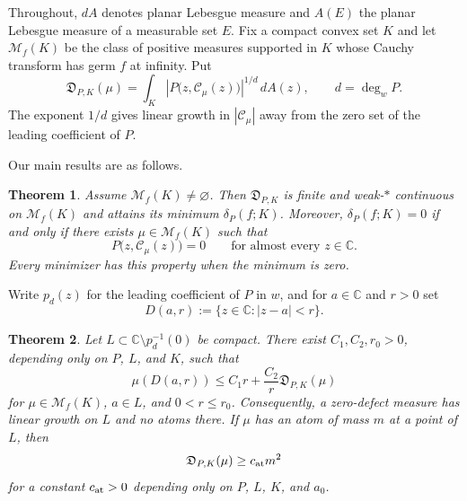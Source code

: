 \documentclass[reqno]{amsart}
\newtheorem{theoremalph}{Theorem}
\theoremstyle{definition}
\theoremstyle{remark}
\newcommand{\bC}{\mathbb C}
\newcommand{\M}{\mathcal M}
\newcommand{\Cauchy}{\mathcal C}
\begin{document}
Throughout, $dA$ denotes planar Lebesgue measure and $A(E)$ the planar
Lebesgue measure of a measurable set $E$. 
Fix a compact convex set $K$ and let $\M_f(K)$ be the class of positive measures
supported in $K$ whose Cauchy transform has germ $f$ at infinity.  Put
\[
 \mathfrak D_{P,K}(\mu)=
 \int_K\left|P\bigl(z,\Cauchy_\mu(z)\bigr)\right|^{1/d}\,dA(z),
 \qquad d=\deg_wP.
\]
The exponent $1/d$ gives linear growth in $|\Cauchy_\mu|$ away from the zero set
of the leading coefficient of $P$.

Our main results are as follows. 

\begin{theoremalph}\label{thmA}
Assume $\M_f(K)\ne\varnothing$.  Then $\mathfrak D_{P,K}$ is finite and
weak-$*$ continuous on $\M_f(K)$ and attains its minimum
$\delta_P(f;K)$.  Moreover, $\delta_P(f;K)=0$ if and only if there exists
$\mu\in\M_f(K)$ such that
\[
 P\bigl(z,\Cauchy_\mu(z)\bigr)=0
 \qquad\text{for almost every }z\in\bC.
\]
Every minimizer has this property when the minimum is zero.
\end{theoremalph}


Write $p_d(z)$ for the leading coefficient of $P$ in $w$, and for $a\in\bC$
and $r>0$ set
\[
 D(a,r):=\{z\in\bC:|z-a|<r\}.
\]

\begin{theoremalph}\label{thmB}
Let $L\subset\bC\setminus p_d^{-1}(0)$ be compact.  There exist
$C_1,C_2,r_0>0$, depending only on $P$, $L$, and $K$, such that
\begin{equation}\label{eq:intro-concentration}
 \mu(D(a,r))\le C_1r+\frac{C_2}{r}\mathfrak D_{P,K}(\mu)
\end{equation}
for $\mu\in\M_f(K)$, $a\in L$, and $0<r\le r_0$.  Consequently, a zero-defect
measure has linear growth on $L$ and no atoms there.  If $\mu$ has an atom of
mass $m$ at a point of $L$, then
\[
 \mathfrak D_{P,K}(\mu)\ge c_{\rm at}m^2
\]
for a constant $c_{\rm at}>0$ depending only on $P$, $L$, $K$, and $a_0$.
\end{theoremalph}
\end{document}
